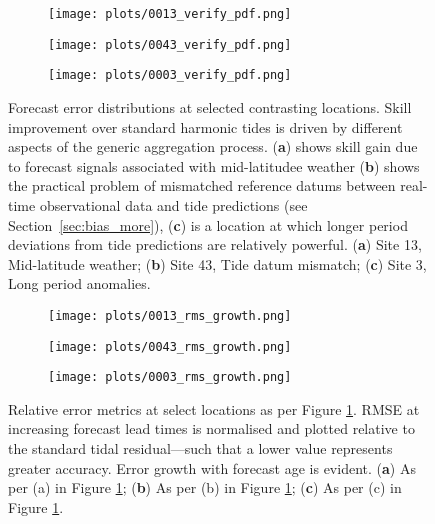 \begin{figure}[H]
    \centering
    \begin{subfigure}{0.30\textwidth}
    \texttt{[image: plots/0013\_verify\_pdf.png]}
    \caption{}
    \end{subfigure}
    \begin{subfigure}{0.30\textwidth}
    \texttt{[image: plots/0043\_verify\_pdf.png]}
    \caption{}
    \end{subfigure}
    \begin{subfigure}{0.30\textwidth}
    \texttt{[image: plots/0003\_verify\_pdf.png]}
    \caption{}
    \end{subfigure}
    \caption{ Forecast error distributions at selected contrasting locations. Skill improvement over standard harmonic tides is driven by different aspects of the generic aggregation process. (\textbf{a}) shows skill gain due to forecast signals associated with mid-latitudee weather (\textbf{b}) shows the practical problem of mismatched reference datums between real-time observational data and tide predictions (see Section~\ref{sec:bias_more}), (\textbf{c}) is a location at which longer period deviations from tide predictions are relatively powerful. (\textbf{a}) Site 13, Mid-latitude weather; (\textbf{b}) Site 43, Tide datum mismatch; (\textbf{c}) Site 3, Long period anomalies.}\vspace{-17pt}

    \label{fig:pdf}
\end{figure}   


\begin{figure}[H]
    \centering
    \begin{subfigure}{0.30\textwidth}
    \texttt{[image: plots/0013\_rms\_growth.png]}
    \caption{}
    \end{subfigure}
    \begin{subfigure}{0.30\textwidth}
    \texttt{[image: plots/0043\_rms\_growth.png]}
    \caption{}
    \end{subfigure}
    \begin{subfigure}{0.30\textwidth}
    \texttt{[image: plots/0003\_rms\_growth.png]}
    \caption{}
    \end{subfigure}
    \caption{ Relative error metrics at select locations as per Figure \ref{fig:pdf}. RMSE at increasing forecast lead times is normalised and plotted relative to the standard tidal residual---such that a lower value represents greater accuracy. Error growth with forecast age is evident. (\textbf{a}) As per (a) in Figure \ref{fig:pdf}; (\textbf{b}) As per (b) in Figure \ref{fig:pdf}; (\textbf{c}) As per (c) in Figure \ref{fig:pdf}.} \vspace{-13pt}
    \label{fig:rms}
\end{figure}   

